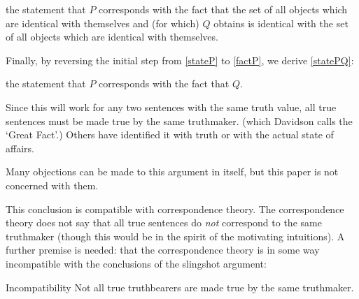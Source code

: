 

	\begin{example}\label{factQ}
	the statement that $P$ corresponds with the fact that the set of all objects which are identical with themselves and (for which) $Q$ obtains is identical with the set of all objects which are identical with themselves.
	\end{example}

Finally, by reversing the initial step from \ref{stateP} to \ref{factP}, we derive \ref{statePQ}:

	\begin{example}\label{statePQ}
	the statement that $P$ corresponds with the fact that $Q$.
	\end{example}

Since this will work for any two sentences with the same truth value, all true sentences must be made true by the same truthmaker. (which Davidson calls the `Great Fact'.)
\parencite[753]{Davidson_1969}
Others have identified it with truth \parencite[216]{Frege_1948} or with the actual state of affairs. 

Many objections can be made to this argument in itself, but this paper is not concerned with them.

This conclusion is compatible with correspondence theory.
The correspondence theory does not say that all true sentences do \emph{not} correspond to the same truthmaker (though this would be in the spirit of the motivating intuitions).
A further premise is needed: that the correspondence theory is in some way incompatible with the conclusions of the slingshot argument:

	\begin{principle}{Incompatibility}\label{incompatible}
	Not all true truthbearers are made true by the same truthmaker.
	\end{principle}

